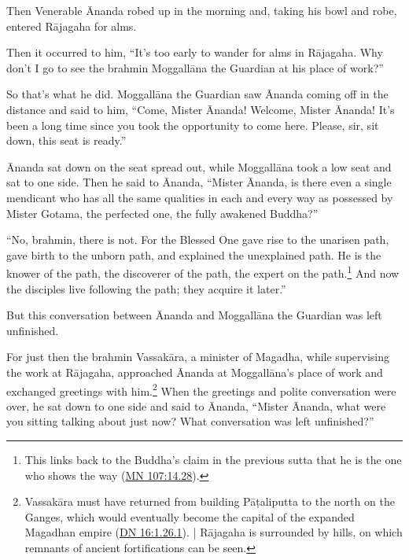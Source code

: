 \documentclass[12pt,openany]{book}%
\begin{document}
Then Venerable Ānanda robed up in the morning and, taking his bowl and robe, entered \textsanskrit{Rājagaha} for alms. 

Then it occurred to him, “It’s too early to wander for alms in \textsanskrit{Rājagaha}. Why don’t I go to see the brahmin \textsanskrit{Moggallāna} the Guardian at his place of work?” 

So that’s what he did. \textsanskrit{Moggallāna} the Guardian saw Ānanda coming off in the distance and said to him, “Come, Mister Ānanda! Welcome, Mister Ānanda! It’s been a long time since you took the opportunity to come here. Please, sir, sit down, this seat is ready.” 

Ānanda sat down on the seat spread out, while \textsanskrit{Moggallāna} took a low seat and sat to one side. Then he said to Ānanda, “Mister Ānanda, is there even a single mendicant who has all the same qualities in each and every way as possessed by Mister Gotama, the perfected one, the fully awakened Buddha?” 

“No, brahmin, there is not. For the Blessed One gave rise to the unarisen path, gave birth to the unborn path, and explained the unexplained path. He is the knower of the path, the discoverer of the path, the expert on the path.\footnote{This links back to the Buddha’s claim in the previous sutta that he is the one who shows the way (\href{https://suttacentral.net/mn107/en/sujato\#14.28}{MN 107:14.28}). } And now the disciples live following the path; they acquire it later.” 

But this conversation between Ānanda and \textsanskrit{Moggallāna} the Guardian was left unfinished. 

For just then the brahmin \textsanskrit{Vassakāra}, a minister of Magadha, while supervising the work at \textsanskrit{Rājagaha}, approached Ānanda at \textsanskrit{Moggallāna}’s place of work and exchanged greetings with him.\footnote{\textsanskrit{Vassakāra} must have returned from building \textsanskrit{Pāṭaliputta} to the north on the Ganges, which would eventually become the capital of the expanded Magadhan empire (\href{https://suttacentral.net/dn16/en/sujato\#1.26.1}{DN 16:1.26.1}). | \textsanskrit{Rājagaha} is surrounded by hills, on which remnants of ancient fortifications can be seen. } When the greetings and polite conversation were over, he sat down to one side and said to Ānanda, “Mister Ānanda, what were you sitting talking about just now? What conversation was left unfinished?” 
\end{document}
